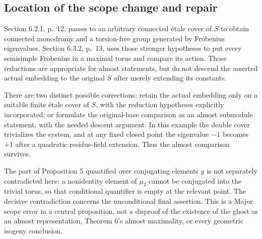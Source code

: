 \documentclass[10pt]{article}
\begin{document}
\subsection*{Location of the scope change and repair}
Section 6.2.1, p. 12, passes to an arbitrary connected étale cover of \(S\) to obtain connected monodromy and a torsion-free group generated by Frobenius eigenvalues. Section 6.3.2, p. 13, uses those stronger hypotheses to put every semisimple Frobenius in a maximal torus and compare its action. Those reductions are appropriate for almost statements, but do not descend the asserted actual embedding to the original \(S\) after merely extending its constants.\par
There are two distinct possible corrections: retain the actual embedding only on a suitable finite étale cover of \(S\), with the reduction hypotheses explicitly incorporated; or formulate the original-base comparison as an almost submodule statement, with the needed descent argument. In this example the double cover trivializes the system, and at any fixed closed point the eigenvalue \(-1\) becomes \(+1\) after a quadratic residue-field extension. Thus the almost comparison survives.\par
The part of Proposition 5 quantified over conjugating elements \(g\) is not separately contradicted here: a nonidentity element of \(\mu_2\) cannot be conjugated into the trivial torus, so that conditional quantifier is empty at the relevant point. The decisive contradiction concerns the unconditional final assertion. This is a Major scope error in a central proposition, not a disproof of the existence of the ghost as an almost representation, Theorem 6’s almost maximality, or every geometric isogeny conclusion.\par
\end{document}
